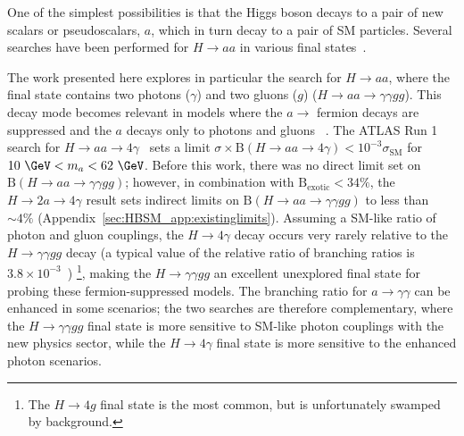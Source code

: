 One of the simplest possibilities is that the Higgs boson decays to a pair of 
new scalars or pseudoscalars, $a$, which in turn decay to a pair of SM particles.
Several searches have been performed for $H\rightarrow a a$ in various final states~\cite{Khachatryan:2017mnf,Aad:2015sva,Aad:2015oqa}.

The work presented here explores in particular the search for $H\rightarrow a a$, where the final state contains two photons ($\gamma$) and two gluons ($g$) ($H\rightarrow aa \rightarrow \gamma\gamma gg$).
This decay mode becomes relevant in models where the $a\rightarrow$ fermion decays are suppressed 
and the $a$ decays only to photons and gluons
~\cite{Curtin:2013fra,hep-ph/0703247}.
The ATLAS Run 1 search for $H\rightarrow aa \to 4\gamma$~\cite{Aad:2015bua} sets 
a limit $\sigma\times \text{B}(H\to aa\rightarrow 4\gamma)<10^{-3}\sigma_\text{SM}$ 
for $10~\GeV<m_a<62~\GeV$.
Before this work, there was no direct limit set on $\text{B}(H\rightarrow aa\rightarrow \gamma\gamma gg)$;
however, in combination with $\text{B}_\text{exotic}<34\%$, 
the $H\rightarrow 2a \to 4\gamma$ result sets indirect limits on $\text{B}(H\rightarrow aa\rightarrow \gamma\gamma gg)$ to less than $\sim4\%$ (Appendix~\ref{sec:HBSM_app:existinglimits}).
Assuming a SM-like ratio of photon and gluon couplings, 
the $H\rightarrow 4\gamma$ decay occurs very rarely relative to the $H\rightarrow \gamma\gamma gg$ decay (a typical value of the relative ratio of branching ratios is $3.8\times10^{-3}$~\cite{hep-ph/0703247})
\footnote{The $H\rightarrow 4g$ final state is the most common, but is unfortunately swamped by background.},
making the $H\rightarrow \gamma\gamma gg$ an excellent unexplored final state for probing these fermion-suppressed models.
The branching ratio for $a\rightarrow \gamma\gamma$ can be enhanced in some scenarios;
the two searches are therefore complementary, 
where the $H\rightarrow \gamma\gamma gg$ final state is more sensitive to SM-like photon couplings 
with the new physics sector, 
while the $H\rightarrow 4\gamma$ final state is more sensitive to the enhanced photon scenarios. 

